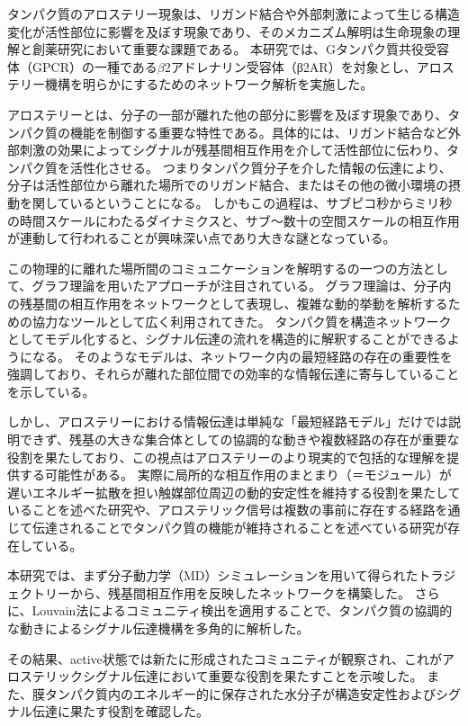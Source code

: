 タンパク質のアロステリー現象は、リガンド結合や外部刺激によって生じる構造変化が活性部位に影響を及ぼす現象であり、そのメカニズム解明は生命現象の理解と創薬研究において重要な課題である。
本研究では、Gタンパク質共役受容体（GPCR）の一種である$\beta$2アドレナリン受容体（β2AR）を対象とし、アロステリー機構を明らかにするためのネットワーク解析を実施した。

アロステリーとは、分子の一部が離れた他の部分に影響を及ぼす現象であり、タンパク質の機能を制御する重要な特性である。具体的には、リガンド結合など外部刺激の効果によってシグナルが残基間相互作用を介して活性部位に伝わり、タンパク質を活性化させる。
つまりタンパク質分子を介した情報の伝達により、分子は活性部位から離れた場所でのリガンド結合、またはその他の微小環境の摂動を関しているということになる。
しかもこの過程は、サブピコ秒からミリ秒の時間スケールにわたるダイナミクスと、サブ\text{\AA}～数十\text{\AA}の空間スケールの相互作用が連動して行われることが興味深い点であり大きな謎となっている。

この物理的に離れた場所間のコミュニケーションを解明するの一つの方法として、グラフ理論を用いたアプローチが注目されている。
グラフ理論は、分子内の残基間の相互作用をネットワークとして表現し、複雑な動的挙動を解析するための協力なツールとして広く利用されてきた。
タンパク質を構造ネットワークとしてモデル化すると、シグナル伝達の流れを構造的に解釈することができるようになる。
そのようなモデルは、ネットワーク内の最短経路の存在の重要性を強調しており、それらが離れた部位間での効率的な情報伝達に寄与していることを示している。

しかし、アロステリーにおける情報伝達は単純な「最短経路モデル」だけでは説明できず、残基の大きな集合体としての協調的な動きや複数経路の存在が重要な役割を果たしており、この視点はアロステリーのより現実的で包括的な理解を提供する可能性がある。
実際に局所的な相互作用のまとまり（＝モジュール）が遅いエネルギー拡散を担い触媒部位周辺の動的安定性を維持する役割を果たしていることを述べた研究や、アロステリック信号は複数の事前に存在する経路を通じて伝達されることでタンパク質の機能が維持されることを述べている研究が存在している。

本研究では、まず分子動力学（MD）シミュレーションを用いて得られたトラジェクトリーから、残基間相互作用を反映したネットワークを構築した。
さらに、Louvain法によるコミュニティ検出を適用することで、タンパク質の協調的な動きによるシグナル伝達機構を多角的に解析した。

その結果、active状態では新たに形成されたコミュニティが観察され、これがアロステリックシグナル伝達において重要な役割を果たすことを示唆した。
また、膜タンパク質内のエネルギー的に保存された水分子が構造安定性およびシグナル伝達に果たす役割を確認した。